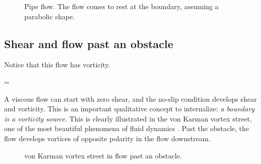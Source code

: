 \begin{figure}
  \begin{center}
  \end{center}
  \caption[]{Pipe flow. The flow comes to rest at the boundary,
    assuming a parabolic shape.}
  \label{fig:pipe_flow}
\end{figure}


\subsection{Shear and flow past an obstacle}

Notice that this flow has vorticity. 

\beq
\omega = 
\eeq

A viscous flow can start with zero shear, and the no-slip
condition develops shear and vorticity. This is an important
qualitative concept to internalize: {\it a boundary is a vorticity
  source}. This is clearly illustrated in the von Karman vortex
street, one of the most beautiful phenomena of fluid dynamics
. Past the obstacle, the flow develops vortices of
opposite polarity in the flow downstream. 

\begin{figure}
  \begin{center}
  \end{center}
  \caption[]{von Karman vortex street in flow past an obstacle.}
  \label{fig:vonkarman}
\end{figure}

